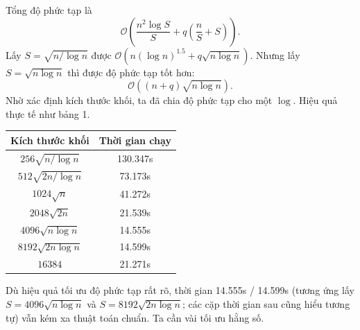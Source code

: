 \documentclass[11pt]{article}
\newcommand{\Oh}{\mathcal{O}}
\begin{document}
Tổng độ phức tạp là
\[
  \Oh\left(\frac{n^2\log S}{S}+q\left(\frac nS+S\right)\right).
\]
Lấy \(S=\sqrt{n/\log n}\) được
\(\Oh(n(\log n)^{1.5}+q\sqrt{n\log n})\). Nhưng lấy
\(S=\sqrt{n\log n}\) thì được độ phức tạp tốt hơn:
\[
  \Oh\left((n+q)\sqrt{n\log n}\right).
\]
Nhờ xác định kích thước khối, ta đã chia độ phức tạp cho một \(\log\). Hiệu
quả thực tế như bảng 1.

\begin{center}
\small
\begin{tabular}{c c}
\textbf{Kích thước khối} & \textbf{Thời gian chạy}\\
\hline
\(256\sqrt{n/\log n}\) & 130.347s\\
\(512\sqrt{2n/\log n}\) & 73.173s\\
\(1024\sqrt n\) & 41.272s\\
\(2048\sqrt{2n}\) & 21.539s\\
\(4096\sqrt{n\log n}\) & 14.555s\\
\(8192\sqrt{2n\log n}\) & 14.599s\\
\(16384\) & 21.271s
\end{tabular}
\end{center}

Dù hiệu quả tối ưu độ phức tạp rất rõ, thời gian 14.555s / 14.599s (tương ứng
lấy \(S=4096\sqrt{n\log n}\) và \(S=8192\sqrt{2n\log n}\); các cặp thời gian
sau cũng hiểu tương tự) vẫn kém xa thuật toán chuẩn. Ta cần vài tối ưu hằng
số.
\end{document}
